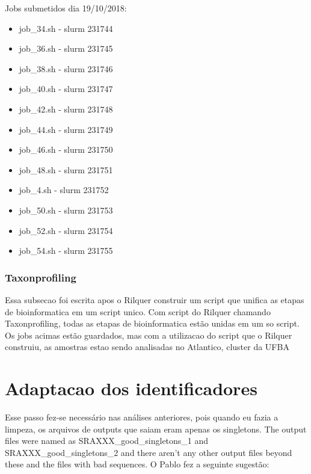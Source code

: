 \documentclass[12pt, a4paper]{report}
\begin{document}
Jobs submetidos dia 19/10/2018:
\begin{itemize}
\item job\_34.sh - slurm 231744
\item job\_36.sh - slurm 231745
\item job\_38.sh - slurm 231746
\item job\_40.sh - slurm 231747
\item job\_42.sh - slurm 231748
\item job\_44.sh - slurm 231749
\item job\_46.sh - slurm 231750
\item job\_48.sh - slurm 231751
\item job\_4.sh - slurm 231752
\item job\_50.sh - slurm 231753
\item job\_52.sh - slurm 231754
\item job\_54.sh - slurm 231755
\end{itemize}

\subsection{Taxonprofiling}
Essa subsecao foi escrita apos o Rilquer construir um script que unifica as etapas de bioinformatica em um script unico.
Com script do Rilquer chamando Taxonprofiling, todas as etapas de bioinformatica estão unidas em um so script. Os jobs acimas estão guardados, mas com a utilizacao do script que o Rilquer construiu, as amostras estao sendo analisadas no Atlantico, cluster da UFBA

\chapter{Adaptacao dos identificadores}

Esse passo fez-se necessário nas análises anteriores, pois quando eu fazia a limpeza, os arquivos de outputs que saiam eram apenas os singletons. 
The output files were named as SRAXXX\_good\_singletons\_1 and SRAXXX\_good\_singletons\_2 and there aren’t any other output files beyond these and the files with bad sequences. 
O Pablo fez a seguinte sugestão:


\end{document}
